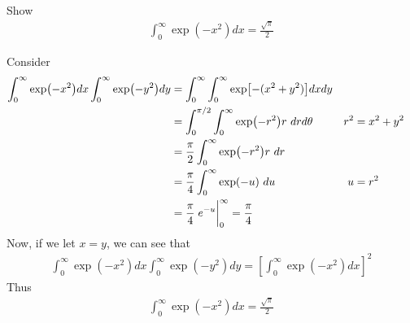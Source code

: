 \documentclass[12pt, english]{book}
\makeatletter
\renewenvironment{proof}[1][\proofname]{\par
	\pushQED{\qed}%
	\normalfont \topsep6\p@\@plus6\p@\relax
	\list{}{%
		\settowidth{\leftmargin}{\itshape\proofname:\hskip\labelsep}%
		\setlength{\labelwidth}{0pt}%
		\setlength{\itemindent}{-\leftmargin}%
	}%
	\item[\hskip\labelsep\itshape#1\@addpunct{:}]\ignorespaces
	}{ \popQED\endlist\@endpefalse}
\makeatother
\begin{document}
	\begin{example}
		\label{int_0^infty e^(-x^2) dx Derivation Example - Complex}
		Show
		\begin{align*}
			\int_{0}^{\infty} \exp(-x^2) dx = \frac{\sqrt{\pi}}{2}
		\end{align*}
		\begin{proof}
			{\color{Grey}
			Consider 
			\begin{align*}
				\int_{0}^{\infty} \exp(-x^2) dx \int_{0}^{\infty} \exp(-y^2) dy
				&= \int_{0}^{\infty} \int_{0}^{\infty} \exp[-(x^2+y^2)] dxdy \\
				&= \int_{0}^{\pi/2} \int_{0}^{\infty} \exp(-r^2) r \ dr d\theta 
				  & r^2 &= x^2 + y^2 \\
				&= \frac{\pi}{2} \int_{0}^{\infty} \exp(-r^2) r \ dr \\
				&= \frac{\pi}{4} \int_{0}^{\infty} \exp(-u) \ du
					& u&=r^2 \\
				&= \frac{\pi}{4} \eval{e^{-u}}_{0}^{\infty} = \frac{\pi}{4}
			\end{align*}
			Now, if we let \(x=y\), we can see that 
			\begin{align*}
				\int_{0}^{\infty} \exp(-x^2) dx \int_{0}^{\infty} \exp(-y^2) dy 
				= \left[\int_{0}^{\infty} \exp(-x^2) dx \right]^2
			\end{align*}
			Thus
			\begin{align*}
				\int_{0}^{\infty} \exp(-x^2) dx = \frac{\sqrt{\pi}}{2}
			\end{align*}
			}
		\end{proof}
	\end{example}
\end{document}
